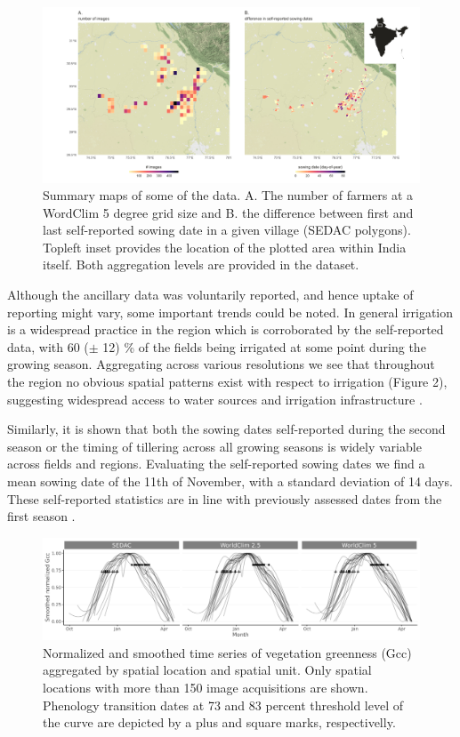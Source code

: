 \documentclass[, manuscript]{copernicus}
\begin{document}
\begin{figure}
\includegraphics[width=1\linewidth]{./figures/summary_map} \caption{Summary maps of some of the data. A. The number of farmers at a WordClim 5 degree grid size and B. the difference between first and last self-reported sowing date in a given village (SEDAC polygons). Topleft inset provides the location of the plotted area within India itself. Both aggregation levels are provided in the dataset.}\label{fig:unnamed-chunk-3}
\end{figure}

Although the ancillary data was voluntarily reported, and hence uptake
of reporting might vary, some important trends could be noted. In
general irrigation is a widespread practice in the region which is
corroborated by the self-reported data, with 60 (\(\pm\) 12) \% of the
fields being irrigated at some point during the growing season.
Aggregating across various resolutions we see that throughout the region
no obvious spatial patterns exist with respect to irrigation (Figure 2),
suggesting widespread access to water sources and irrigation
infrastructure \citep{kumar2018}.

Similarly, it is shown that both the sowing dates self-reported during
the second season or the timing of tillering across all growing seasons
is widely variable across fields and regions. Evaluating the
self-reported sowing dates we find a mean sowing date of the 11th of
November, with a standard deviation of 14 days. These self-reported
statistics are in line with previously assessed dates from the first
season \citep{hufkens2019}.

\begin{figure}
\includegraphics[width=1\linewidth]{./figures/summary_time_series} \caption{Normalized and smoothed time series of vegetation greenness (Gcc) aggregated by spatial location and spatial unit. Only spatial locations with more than 150 image acquisitions are shown. Phenology transition dates at 73 and 83 percent threshold level of the curve are depicted by a plus and square marks, respectivelly.}\label{fig:unnamed-chunk-4}
\end{figure}
\end{document}
